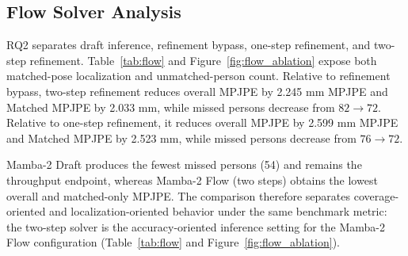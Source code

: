 \documentclass[conference,onecolumn]{IEEEtran}
\begin{document}
\subsection{Flow Solver Analysis}
RQ2 separates draft inference, refinement bypass, one-step refinement, and two-step refinement. Table~\ref{tab:flow} and Figure~\ref{fig:flow_ablation} expose both matched-pose localization and unmatched-person count. Relative to refinement bypass, two-step refinement reduces overall MPJPE by 2.245 mm MPJPE and Matched MPJPE by 2.033 mm, while missed persons decrease from $82\rightarrow72$. Relative to one-step refinement, it reduces overall MPJPE by 2.599 mm MPJPE and Matched MPJPE by 2.523 mm, while missed persons decrease from $76\rightarrow72$.

Mamba-2 Draft produces the fewest missed persons (54) and remains the throughput endpoint, whereas Mamba-2 Flow (two steps) obtains the lowest overall and matched-only MPJPE. The comparison therefore separates coverage-oriented and localization-oriented behavior under the same benchmark metric: the two-step solver is the accuracy-oriented inference setting for the Mamba-2 Flow configuration (Table~\ref{tab:flow} and Figure~\ref{fig:flow_ablation}).

\begin{table}[!t]
\centering
\caption{Flow-solver analysis under the same Mamba-2 draft-to-refine architecture. Lower overall MPJPE, Matched MPJPE, and missed-person count are better; MPJPE values are in millimeters and use the fixed 500 mm benchmark miss penalty.}
\label{tab:flow}
\end{table}
\end{document}
